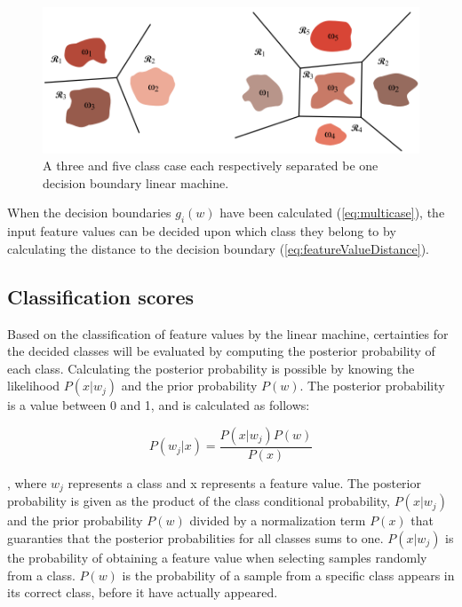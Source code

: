 \begin{figure}[H]                 
	\includegraphics[width=.6\textwidth]{figures/xBackground/LMregions}  
	\caption{A three and five class case each respectively separated be one decision boundary linear machine. \cite{Duda2000}}
	\label{fig:LMregions} 
\end{figure}

When the decision boundaries $g_i(w)$ have been calculated (\eqref{eq:multicase}), the input feature values can be decided upon which class they belong to by calculating the distance to the decision boundary (\eqref{eq:featureValueDistance}). 




\subsection{Classification scores}
Based on the classification of feature values by the linear machine, certainties for the decided classes will be evaluated by computing the posterior probability of each class. Calculating the posterior probability is possible by knowing the likelihood $P(x|w_j)$ and the prior probability $P(w)$.
The posterior probability is a value between 0 and 1, and is calculated as follows:

\begin{equation}
P(w_j|x) = \frac{P(x|w_j)P(w)}{P(x)}
\end{equation}

, where $w_j$ represents a class and x represents a feature value. The posterior probability is given as the product of the class conditional probability, $P(x|w_j)$ and the prior probability $P(w)$ divided by a normalization term $P(x)$ that guaranties that the posterior probabilities for all classes sums to one. $P(x|w_j)$ is the probability of obtaining a feature value when selecting samples randomly from a class. $P(w)$ is the probability of a sample from a specific class appears in its correct class, before it have actually appeared. 

